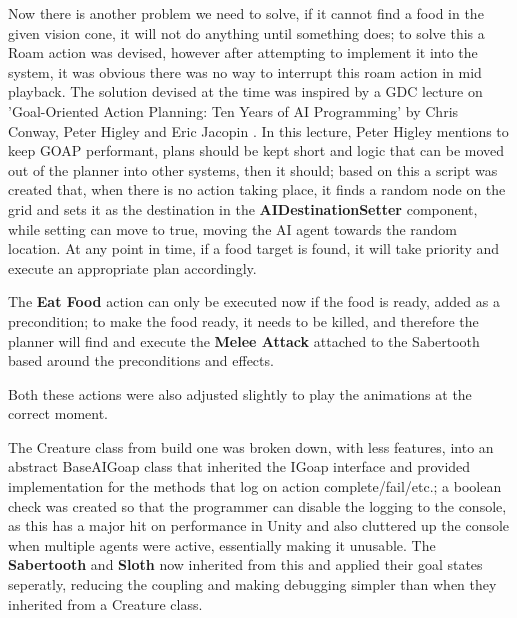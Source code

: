 \documentclass[11pt]{report}
\begin{document}
Now there is another problem we need to solve, if it cannot find a food in the given vision cone, it will not do anything until something does; to solve this a Roam action was devised, however after attempting to implement it into the system, it was obvious there was no way to interrupt this roam action in mid playback. The solution devised at the time was inspired by a GDC lecture on 'Goal-Oriented Action Planning: Ten Years of AI Programming' by Chris Conway, Peter Higley and Eric Jacopin \cite{10goap}. In this lecture, Peter Higley mentions to keep GOAP performant, plans should be kept short and logic that can be moved out of the planner into other systems, then it should; based on this a script was created that, when there is no action taking place, it finds a random node on the grid and sets it as the destination in the \textbf{AIDestinationSetter} component, while setting can move to true, moving the AI agent towards the random location. At any point in time, if a food target is found, it will take priority and execute an appropriate plan accordingly.

The \textbf{Eat Food} action can only be executed now if the food is ready, added as a precondition; to make the food ready, it needs to be killed, and therefore the planner will find and execute the \textbf{Melee Attack} attached to the Sabertooth based around the preconditions and effects.

Both these actions were also adjusted slightly to play the animations at the correct moment.

The Creature class from build one was broken down, with less features, into an abstract BaseAIGoap class that inherited the IGoap interface and provided implementation for the methods that log on action complete/fail/etc.; a boolean check was created so that the programmer can disable the logging to the console, as this has a major hit on performance in Unity and also cluttered up the console when multiple agents were active, essentially making it unusable. The \textbf{Sabertooth} and \textbf{Sloth} now inherited from this and applied their goal states seperatly, reducing the coupling and making debugging simpler than when they inherited from a Creature class.
\end{document}
